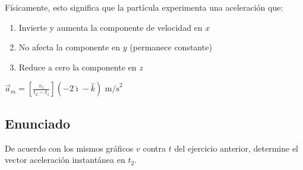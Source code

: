 \documentclass[12pt, a4paper]{article}
\begin{document}
Físicamente, esto significa que la partícula experimenta una aceleración que:
\begin{enumerate}
    \item Invierte y aumenta la componente de velocidad en $x$
    \item No afecta la componente en $y$ (permanece constante)
    \item Reduce a cero la componente en $z$
\end{enumerate}

\begin{tcolorbox}[colback=blue!5!white, colframe=blue!75!black, title=Respuesta Final]
\centering
\Large $\boxed{\vec{a}_m = \left[\frac{v_1}{t_2 - t_1}\right](-2\hat{\imath} - \hat{k}) \text{ m/s}^2}$
\end{tcolorbox}

\newpage

\subsection*{Enunciado}
De acuerdo con los mismos gráficos $v$ contra $t$ del ejercicio anterior, determine el vector aceleración instantánea en $t_2$.
\end{document}
